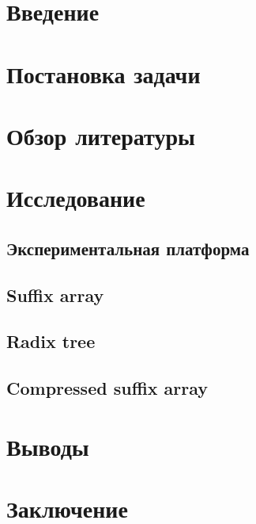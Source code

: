\newpage
\tableofcontents
\newpage

\section{Введение}


\newpage
\section{Постановка задачи}


\newpage
\section{Обзор литературы}


\newpage
\section{Исследование}


\newpage
\subsection{Экспериментальная платформа}


\newpage
\subsection{Suffix array}


\newpage
\subsection{Radix tree}


\subsection{Compressed suffix array}


\section{Выводы}


\section{Заключение}

